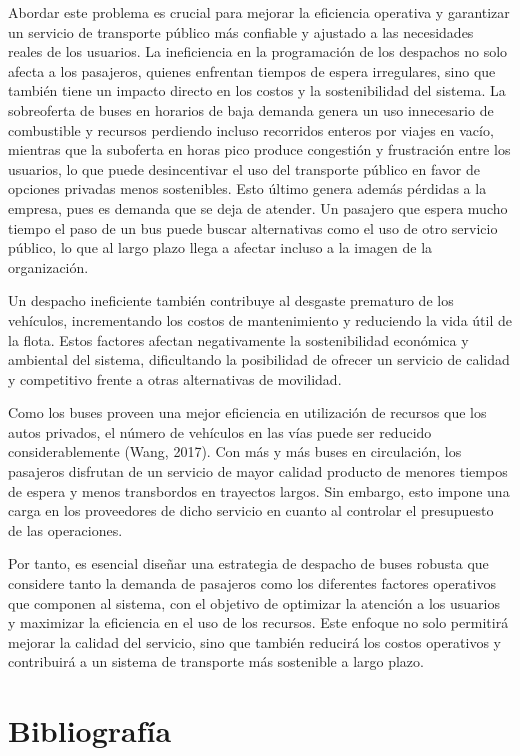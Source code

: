 \documentclass[preprint,11pt]{elsarticle}
\begin{document}
Abordar este problema es crucial para mejorar la eficiencia operativa y garantizar un servicio de transporte público más confiable y ajustado a las necesidades reales de los usuarios. La ineficiencia en la programación de los despachos no solo afecta a los pasajeros, quienes enfrentan tiempos de espera irregulares, sino que también tiene un impacto directo en los costos y la sostenibilidad del sistema. La sobreoferta de buses en horarios de baja demanda genera un uso innecesario de combustible y recursos perdiendo incluso recorridos enteros por viajes en vacío, mientras que la suboferta en horas pico produce congestión y frustración entre los usuarios, lo que puede desincentivar el uso del transporte público en favor de opciones privadas menos sostenibles. Esto último genera además pérdidas a la empresa, pues es demanda que se deja de atender. Un pasajero que espera mucho tiempo el paso de un bus puede buscar alternativas como el uso de otro servicio público, lo que al largo plazo llega a afectar incluso a la imagen de la organización.

Un despacho ineficiente también contribuye al desgaste prematuro de los vehículos, incrementando los costos de mantenimiento y reduciendo la vida útil de la flota. Estos factores afectan negativamente la sostenibilidad económica y ambiental del sistema, dificultando la posibilidad de ofrecer un servicio de calidad y competitivo frente a otras alternativas de movilidad.

Como los buses proveen una mejor eficiencia en utilización de recursos que los autos privados, el número de vehículos en las vías puede ser reducido considerablemente (Wang, 2017). Con más y más buses en circulación, los pasajeros disfrutan de un servicio de mayor calidad producto de menores tiempos de espera y menos transbordos en trayectos largos. Sin embargo, esto impone una carga en los proveedores de dicho servicio en cuanto al controlar el presupuesto de las operaciones. 

Por tanto, es esencial diseñar una estrategia de despacho de buses robusta que considere tanto la demanda de pasajeros como los diferentes factores operativos que componen al sistema, con el objetivo de optimizar la atención a los usuarios y maximizar la eficiencia en el uso de los recursos. Este enfoque no solo permitirá mejorar la calidad del servicio, sino que también reducirá los costos operativos y contribuirá a un sistema de transporte más sostenible a largo plazo.



\section{Bibliografía}
\printbibliography %
\end{document}
